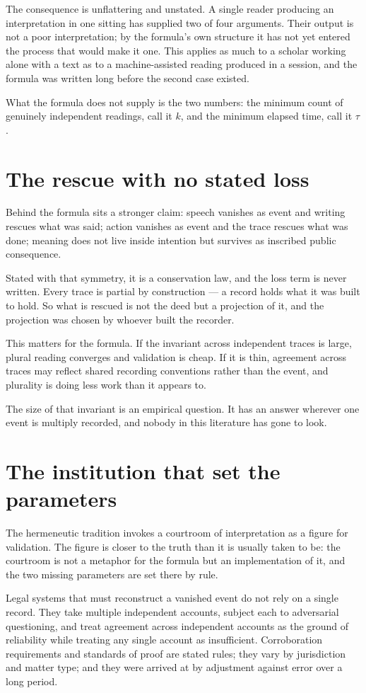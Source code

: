 \documentclass[11pt,a4paper]{article}
\begin{document}
The consequence is unflattering and unstated. A single reader producing an interpretation in one sitting has supplied two of four arguments. Their output is not a poor interpretation; by the formula's own structure it has not yet entered the process that would make it one. This applies as much to a scholar working alone with a text as to a machine-assisted reading produced in a session, and the formula was written long before the second case existed.

What the formula does not supply is the two numbers: the minimum count of genuinely independent readings, call it $k$, and the minimum elapsed time, call it $\tau$.

\section{The rescue with no stated loss}
Behind the formula sits a stronger claim: speech vanishes as event and writing rescues what was said; action vanishes as event and the trace rescues what was done; meaning does not live inside intention but survives as inscribed public consequence.

Stated with that symmetry, it is a conservation law, and the loss term is never written. Every trace is partial by construction --- a record holds what it was built to hold. So what is rescued is not the deed but a projection of it, and the projection was chosen by whoever built the recorder.

This matters for the formula. If the invariant across independent traces is large, plural reading converges and validation is cheap. If it is thin, agreement across traces may reflect shared recording conventions rather than the event, and plurality is doing less work than it appears to.

The size of that invariant is an empirical question. It has an answer wherever one event is multiply recorded, and nobody in this literature has gone to look.

\section{The institution that set the parameters}
The hermeneutic tradition invokes a courtroom of interpretation as a figure for validation. The figure is closer to the truth than it is usually taken to be: the courtroom is not a metaphor for the formula but an implementation of it, and the two missing parameters are set there by rule.

Legal systems that must reconstruct a vanished event do not rely on a single record. They take multiple independent accounts, subject each to adversarial questioning, and treat agreement across independent accounts as the ground of reliability while treating any single account as insufficient. Corroboration requirements and standards of proof are stated rules; they vary by jurisdiction and matter type; and they were arrived at by adjustment against error over a long period.
\end{document}
